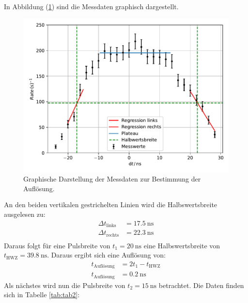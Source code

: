 \FloatBarrier
\noindent In Abbildung (\ref{fig:plateau1}) sind die Messdaten graphisch dargestellt.
\begin{figure}
	\centering
	\includegraphics[scale=0.7]{fig/Plateau.pdf}
	\caption{Graphische Darstellung der Messdaten zur Bestimmung der Auflösung.}
	\label{fig:plateau1}
\end{figure}
\FloatBarrier
\noindent An den beiden vertikalen gestrichelten Linien wird die Halbswertsbreite ausgelesen zu:
\begin{align*}
	\Delta t_\mathrm{links}&=\SI{17.5}{\nano\second} \\
	\Delta t_\mathrm{rechts}&=\SI{22.3}{\nano\second} \\
\end{align*}
Daraus folgt für eine Pulsbreite von $t_\mathrm{1}=\SI{20}{\nano\second}$ eine Halbswertsbreite von $t_\mathrm{HWZ}=\SI{39.8}{\nano\second}$. Daraus ergibt sich eine Auflösung von:
\begin{align*}
	t_\mathrm{Auflösung}&=2 t_\mathrm{1}-t_\mathrm{HWZ} \\
	t_\mathrm{Auflösung}&=\SI{0.2}{\nano\second}
\end{align*}
Als nächstes wird nun die Pulsbreite von $t_\mathrm{2}=\SI{15}{\nano\second}$ betrachtet. Die Daten finden sich in Tabelle \ref{tab:tab2}:
